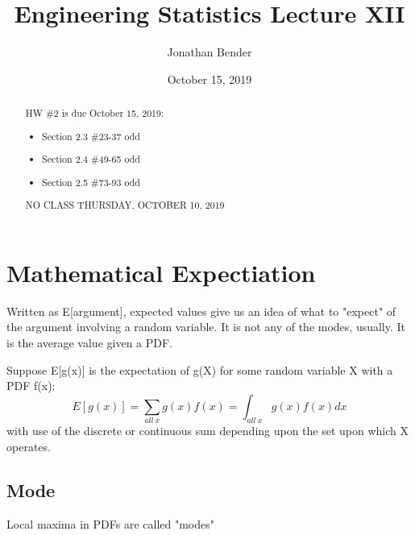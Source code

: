 \documentclass[]{article}
\title{Engineering Statistics Lecture XII}
\author{Jonathan Bender}
\date{October 15, 2019}
\begin{document}
	
	\maketitle
	
	\begin{abstract}	
		HW \#2 is due October 15, 2019:
		\begin{itemize}
			\item Section 2.3 \#23-37 odd
			\item Section 2.4 \#49-65 odd
			\item Section 2.5 \#73-93 odd
		\end{itemize}
	
		NO CLASS THURSDAY, OCTOBER 10, 2019
	\end{abstract}

	\section{Mathematical Expectiation}
	Written as E[argument], expected values give us an idea of what to "expect" of the argument involving a random variable. It is not any of the modes, usually. It is the average value given a PDF.
	
	Suppose E[g(x)] is the expectation of g(X) for some random variable X with a PDF f(x):
	$$E[g(x)]=\sum_{all\ x}g(x)f(x)=\int_{all\ x}g(x)f(x)dx$$
	with use of the discrete or continuous sum depending upon the set upon which X operates.
		\subsection{Mode}
		Local maxima in PDFs are called "modes"
	
\end{document}
